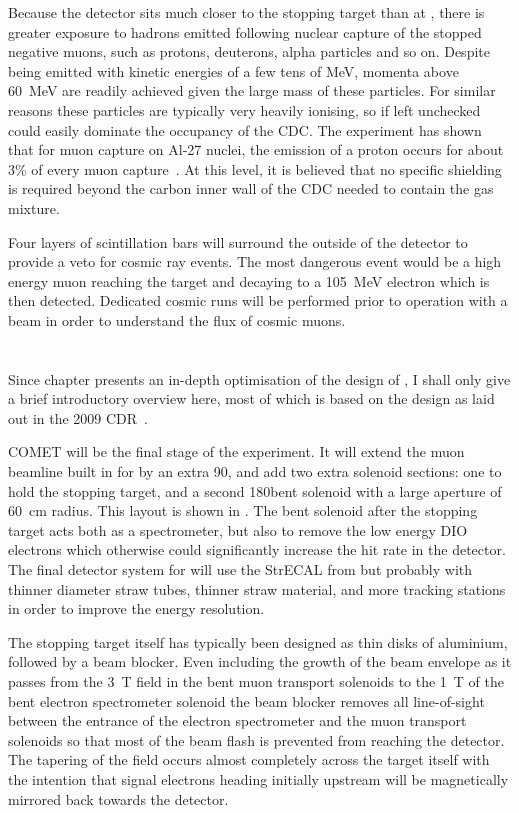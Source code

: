 Because the \phaseI detector sits much closer to the stopping target than at \phaseII, there is greater exposure to hadrons emitted following nuclear capture of the stopped negative muons, such as protons, deuterons, alpha particles and so on.
Despite being emitted with kinetic energies of a few tens of MeV, momenta above 60~MeV are readily achieved given the large mass of these particles.
For similar reasons these particles are typically very heavily ionising, so if left unchecked could easily dominate the occupancy of the \ac{CDC}.
The \alcap experiment has shown that for muon capture on Al-27 nuclei, the emission of a proton occurs for about 3\% of every muon capture~\cite{NamThesis}.
At this level, it is believed that no specific shielding is required beyond the carbon inner wall of the \ac{CDC} needed to contain the gas mixture.

Four layers of scintillation bars will surround the outside of the detector to provide a veto for cosmic ray events.
The most dangerous event would be a high energy muon reaching the target and decaying to a 105~MeV electron which is then detected. 
Dedicated cosmic runs will be performed prior to operation with a beam in order to understand the flux of cosmic muons.

\section{\COMET \phaseII}
\FigPhaseII
Since chapter  presents an in-depth optimisation of the design of \phaseII, I shall only give a brief introductory overview here, most of which is based on the design as laid out in the 2009 CDR~\cite{CDRphase2}.

COMET \phaseII will be the final stage of the experiment.
It will extend the muon beamline built in for \phaseI by an extra 90\degree, and add two extra solenoid sections: one to hold the stopping target, and a second 180\degree bent solenoid with a large aperture of 60~cm radius.
This layout is shown in .
The bent solenoid after the stopping target acts both as a spectrometer, but also to remove the low energy \ac{DIO} electrons which otherwise could significantly increase the hit rate in the detector.
The final detector system for \phaseII will use the \ac{StrECAL} from \phaseI but probably with thinner diameter straw tubes, thinner straw material, and more tracking stations in order to improve the energy resolution.

The stopping target itself has typically been designed as thin disks of aluminium, followed by a beam blocker.  
Even including the growth of the beam envelope as it passes from the 3~T field in the bent muon transport solenoids to the 1~T of the bent electron spectrometer solenoid the beam blocker removes all line-of-sight between the entrance of the electron spectrometer and the muon transport solenoids so that most of the beam flash is prevented from reaching the detector.
The tapering of the field occurs almost completely across the target itself with the intention that signal electrons heading initially upstream will be magnetically mirrored back towards the detector.

